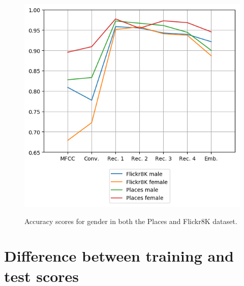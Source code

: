 \documentclass[a4paper, oneside]{book}
\begin{document}
\begin{appendices}
\begin{figure}[h!]
	\centering
	\includegraphics[scale=0.5]{images/gender-bias-accuracy.png}\\
	\caption{\label{table:gender-bias} Accuracy scores for gender in both the Places and Flickr8K dataset.  }
\end{figure}

\chapter{Difference between training and test scores}\label{appendix:difference-between-training-and-test-scores}


\end{appendices}
\end{document}
